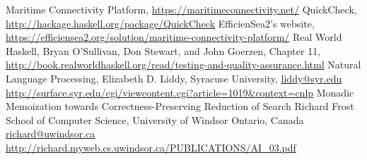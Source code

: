 \begin{thebibliography}{9}
		Maritime Connectivity Platform,
		\url{https://maritimeconnectivity.net/}
		QuickCheck,
		\url{http://hackage.haskell.org/package/QuickCheck}
		EfficienSea2's website,
		\url{https://efficiensea2.org/solution/maritime-connectivity-platform/}
		Real World Haskell,
		Bryan O'Sullivan, Don Stewart, and John Goerzen,
		Chapter 11,
		\url{http://book.realworldhaskell.org/read/testing-and-quality-assurance.html}
		Natural Language Processing,
		Elizabeth D. Liddy,
		Syracuse University,
		\url{liddy@syr.edu}
		\url{http://surface.syr.edu/cgi/viewcontent.cgi?article=1019&context=cnlp}
		Monadic Memoization towards Correctness-Preserving Reduction of Search
		Richard Frost
		School of Computer Science, University of Windsor
		Ontario, Canada
		\url{richard@uwindsor.ca}
		\url{http://richard.myweb.cs.uwindsor.ca/PUBLICATIONS/AI_03.pdf}
\end{thebibliography}